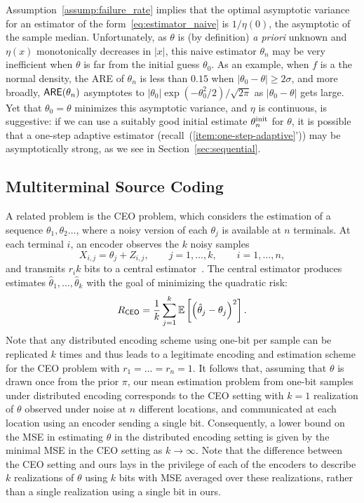Assumption~\ref{assump:failure_rate} implies that the optimal asymptotic
variance for an estimator of the form~\eqref{eq:estimator_naive} is $1 /
\eta(0)$, the asymptotic of the sample median. Unfortunately, as $\theta$ is
(by definition) \emph{a priori} unknown and $\eta(x)$ monotonically
decreases in $|x|$, this naive estimator $\theta_n$ may be very inefficient
when $\theta$ is far from the initial guess $\theta_0$. As an example, when
$f$ is a the normal density, the ARE of ${\theta}_n$ is less than $0.15$
when $|\theta_0 - \theta| \ge 2\sigma$, and more broadly, $\mathsf{ARE}(\theta_n)$
asymptotes to $|\theta_0| \exp(-\theta_0^2 / 2) / \sqrt{2\pi}$ as $|\theta_0
- \theta|$ gets large.  Yet that $\theta_0 = \theta$ minimizes this
asymptotic variance, and $\eta$ is continuous, is suggestive: if we can use
a suitably good initial estimate $\theta_n^{\textup{init}}$ for $\theta$, it is
possible that a one-step adaptive estimator
(recall~(\ref{item:one-step-adaptive}')) may be asymptotically strong, as we
see in Section~\ref{sec:sequential}.

\subsection{Multiterminal Source Coding}
\label{sec:ceo}

A related problem is the CEO problem, which considers the estimation of a
sequence $\theta_1,\theta_2\ldots$, where a noisy version of each $\theta_j$
is available at $n$ terminals. At each terminal $i$, an encoder observes the
$k$ noisy samples
\[
X_{i,j} = \theta_j + Z_{i,j},\qquad j=1,\ldots,k, \qquad i = 1,\ldots,n,
\]
and transmits $r_i k$ bits to a central estimator~\cite{berger1996ceo}. The
central estimator produces estimates ${\hat{\theta}}_1,\ldots,{\hat{\theta}}_k$ with
the goal of minimizing the quadratic risk:
\[
R_{\mathsf{CEO}} = \frac{1}{k} \sum_{j=1}^k \mathbb E \left[\left(\hat{\theta}_j - {\theta_j} \right)^2 \right]. 
\]
Note that any distributed encoding scheme using one-bit per sample can be replicated $k$ times and thus leads to a legitimate encoding and estimation scheme for the CEO problem with $r_1=\ldots=r_n = 1$. It follows that, assuming that $\theta$ is drawn once from the prior $\pi$, our mean estimation problem from one-bit samples under distributed encoding corresponds to the CEO setting with $k=1$ realization of $\theta$ observed under noise at $n$ different locations, and communicated at each location using an encoder sending a single bit. 
%
Consequently, a lower bound on the MSE in estimating $\theta$ in the
distributed encoding setting is given by the minimal MSE in the CEO setting
as $k \to \infty$. Note that the difference between the CEO setting and ours
lays in the privilege of each of the encoders to describe $k$ realizations
of $\theta$ using $k$ bits with MSE averaged over these realizations, rather
than a single realization using a single bit in ours.

